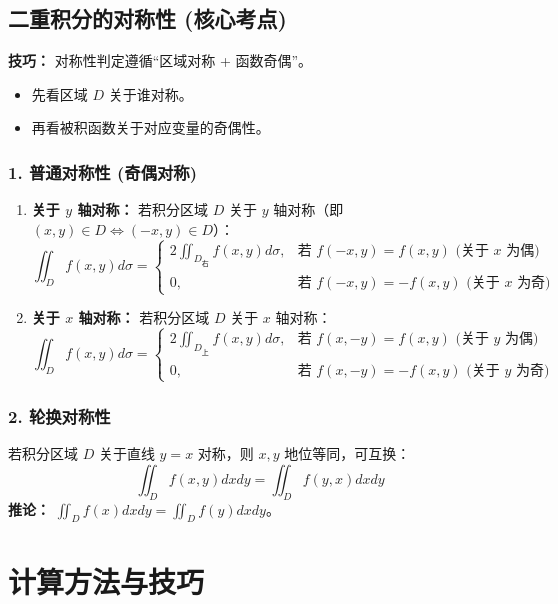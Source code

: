 \documentclass[a4paper,12pt]{ctexart}
\newenvironment{rednote}
  {\begin{tcolorbox}[colback=notepurple, colframe=highlightred, boxrule=1pt, title=\textbf{重点/技巧/手写笔记}]}
  {\end{tcolorbox}}
\begin{document}
\subsection{二重积分的对称性 (核心考点)}

\begin{rednote}
    \textbf{技巧：} 对称性判定遵循“区域对称 + 函数奇偶”。
    \begin{itemize}
        \item 先看区域 $D$ 关于谁对称。
        \item 再看被积函数关于对应变量的奇偶性。
    \end{itemize}
\end{rednote}

\subsubsection{1. 普通对称性 (奇偶对称)}
\begin{enumerate}
    \item \textbf{关于 $y$ 轴对称：} 若积分区域 $D$ 关于 $y$ 轴对称（即 $(x,y) \in D \Leftrightarrow (-x,y) \in D$）：
    \[ \iint_D f(x,y) d\sigma = \begin{cases} 2 \iint_{D_{\text{右}}} f(x,y) d\sigma, & \text{若 } f(-x,y) = f(x,y) \text{ (关于 } x \text{ 为偶)} \\ 0, & \text{若 } f(-x,y) = -f(x,y) \text{ (关于 } x \text{ 为奇)} \end{cases} \]
    
    \item \textbf{关于 $x$ 轴对称：} 若积分区域 $D$ 关于 $x$ 轴对称：
    \[ \iint_D f(x,y) d\sigma = \begin{cases} 2 \iint_{D_{\text{上}}} f(x,y) d\sigma, & \text{若 } f(x,-y) = f(x,y) \text{ (关于 } y \text{ 为偶)} \\ 0, & \text{若 } f(x,-y) = -f(x,y) \text{ (关于 } y \text{ 为奇)} \end{cases} \]
\end{enumerate}

\subsubsection{2. 轮换对称性}
若积分区域 $D$ 关于直线 $y=x$ 对称，则 $x, y$ 地位等同，可互换：
\[ \iint_D f(x,y) dxdy = \iint_D f(y,x) dxdy \]
\textbf{推论：} $\iint_D f(x) dxdy = \iint_D f(y) dxdy$。

\section{计算方法与技巧}
\end{document}
